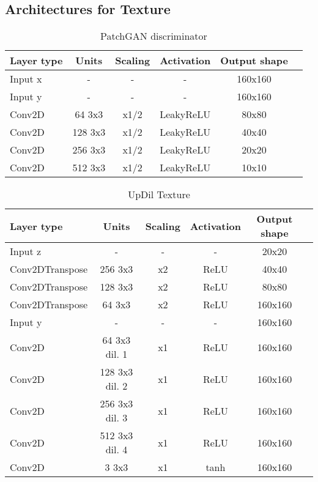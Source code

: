 \subsection{Architectures for Texture}

\begin{table*}[!h]
	\centering
	\begin{tabular}{|l|c|c|c|c|c|}
		\hline
		Layer type & Units & Scaling & Activation & Output shape\\
		\hline
		Input x & - & - & - & 160x160\\
		Input y & - & - & - & 160x160\\
		Conv2D & 64 3x3 & x1/2 & LeakyReLU & 80x80 \\
		Conv2D & 128 3x3 & x1/2 & LeakyReLU & 40x40 \\
		Conv2D & 256 3x3 & x1/2 & LeakyReLU & 20x20 \\
		Conv2D & 512 3x3 & x1/2 & LeakyReLU &  10x10\\
		\hline
	\end{tabular}
	\caption{PatchGAN discriminator}
\end{table*}

\begin{table*}[!h]
	\centering
	\begin{tabular}{|l|c|c|c|c|c|}
		\hline
		Layer type & Units & Scaling & Activation & Output shape\\
		\hline
		Input z & - & - & - & 20x20 \\
		Conv2DTranspose & 256 3x3 & x2 & ReLU & 40x40 \\
		Conv2DTranspose & 128 3x3 & x2 & ReLU & 80x80 \\
		Conv2DTranspose & 64 3x3 & x2 & ReLU & 160x160 \\
		Input y & - & - & - & 160x160\\
		Conv2D & 64 3x3 dil. 1 & x1 & ReLU & 160x160 \\
		Conv2D & 128 3x3  dil. 2 & x1 & ReLU & 160x160 \\
		Conv2D & 256 3x3 dil. 3 & x1 & ReLU & 160x160 \\
		Conv2D & 512 3x3  dil. 4& x1 & ReLU & 160x160 \\
		Conv2D & 3 3x3 & x1 & tanh & 160x160 \\
		\hline
	\end{tabular}
	\caption{UpDil Texture}
\end{table*}


